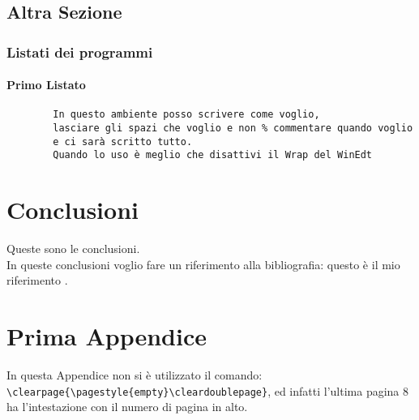 \documentclass[12pt,a4paper,openright,twoside]{report}
\renewcommand{\chaptermark}[1]{\markboth{\thechapter.\ #1}{}}
\begin{document}
    \section{Altra Sezione}\label{sec:prova}%
    \subsection{Listati dei programmi}
    \subsubsection{Primo Listato}
    \begin{verbatim}
        In questo ambiente posso scrivere come voglio,
        lasciare gli spazi che voglio e non % commentare quando voglio
        e ci sarà scritto tutto.
        Quando lo uso è meglio che disattivi il Wrap del WinEdt
    \end{verbatim}
    \clearpage{\pagestyle{empty}\cleardoublepage}
    \chapter*{Conclusioni}
     Queste sono le
    conclusioni.\\
    In queste conclusioni voglio fare un riferimento alla
    bibliografia: questo \`e il mio riferimento \cite{K3,K4}.
    \renewcommand{\chaptermark}[1]{\markright{\thechapter \ #1}{}}
    \lhead[\fancyplain{}{\bfseries\thepage}]{\fancyplain{}{\bfseries\rightmark}}
    \appendix                               %
    \chapter{Prima Appendice}               %
    In questa Appendice non si \`e utilizzato il comando:\\
    \verb"\clearpage{\pagestyle{empty}\cleardoublepage}", ed infatti
    l'ultima pagina 8 ha l'intestazione con il numero di pagina in
    alto.
\end{document}
